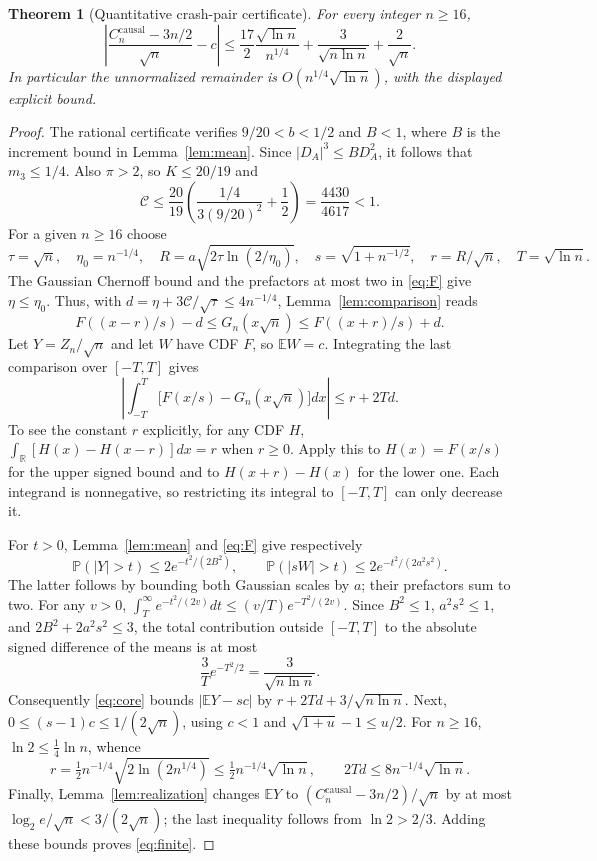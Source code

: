 \documentclass[11pt,a4paper]{article}
\newtheorem{theorem}{Theorem}
\newcommand{\E}{\mathbb E}
\newcommand{\Prob}{\mathbb P}
\newcommand{\causal}{\mathrm{causal}}
\newcommand{\R}{\mathbb R}
\begin{document}
\begin{theorem}[Quantitative crash-pair certificate]\label{thm:finite}
For every integer $n\ge16$,
\begin{equation}\label{eq:finite}
\boxed{\left|\frac{C_n^{\causal}-3n/2}{\sqrt n}-c\right|
\le \frac{17}{2}\frac{\sqrt{\ln n}}{n^{1/4}}
+\frac{3}{\sqrt{n\ln n}}+\frac{2}{\sqrt n}.}
\end{equation}
In particular the unnormalized remainder is
$O(n^{1/4}\sqrt{\ln n})$, with the displayed explicit bound.
\end{theorem}
\begin{proof}
The rational certificate verifies $9/20<b<1/2$ and $B<1$, where
$B$ is the increment bound in Lemma~\ref{lem:mean}. Since
$|D_A|^3\le B D_A^2$, it follows that $m_3\le1/4$. Also $\pi>2$,
so $K\le20/19$ and
\[
\mathcal C\le\frac{20}{19}
\left(\frac{1/4}{3(9/20)^2}+\frac12\right)
=\frac{4430}{4617}<1.
\]
For a given $n\ge16$ choose
\[
\tau=\sqrt n,\quad \eta_0=n^{-1/4},\quad
R=a\sqrt{2\tau\ln(2/\eta_0)},\quad
s=\sqrt{1+n^{-1/2}},\quad r=R/\sqrt n,\quad T=\sqrt{\ln n}.
\]
The Gaussian Chernoff bound and the prefactors at most two in
\eqref{eq:F} give $\eta\le\eta_0$. Thus, with
$d=\eta+3\mathcal C/\sqrt\tau\le4n^{-1/4}$,
Lemma~\ref{lem:comparison} reads
\[
F((x-r)/s)-d\le G_n(x\sqrt n)\le F((x+r)/s)+d.
\]
Let $Y=Z_n/\sqrt n$ and let $W$ have CDF $F$, so $\E W=c$.
Integrating the last comparison over $[-T,T]$ gives
\begin{equation}\label{eq:core}
\left|\int_{-T}^T\bigl[F(x/s)-G_n(x\sqrt n)\bigr]dx\right|
\le r+2Td.
\end{equation}
To see the constant $r$ explicitly, for any CDF $H$,
$\int_{\R}[H(x)-H(x-r)]dx=r$ when $r\ge0$. Apply this to $H(x)=F(x/s)$
for the upper signed bound and to $H(x+r)-H(x)$ for the lower one.
Each integrand is nonnegative, so restricting its integral to
$[-T,T]$ can only decrease it.

For $t>0$, Lemma~\ref{lem:mean} and \eqref{eq:F} give respectively
\[
\Prob(|Y|>t)\le2e^{-t^2/(2B^2)},\qquad
\Prob(|sW|>t)\le2e^{-t^2/(2a^2s^2)}.
\]
The latter follows by bounding both Gaussian scales by $a$; their
prefactors sum to two. For any $v>0$,
$\int_T^\infty e^{-t^2/(2v)}dt\le(v/T)e^{-T^2/(2v)}$.
Since $B^2\le1$, $a^2s^2\le1$, and
$2B^2+2a^2s^2\le3$, the total contribution outside $[-T,T]$
to the absolute signed difference of the means is at most
\[
\frac3T e^{-T^2/2}=\frac{3}{\sqrt{n\ln n}}.
\]
Consequently \eqref{eq:core} bounds $|\E Y-sc|$ by
$r+2Td+3/\sqrt{n\ln n}$. Next,
$0\le(s-1)c\le1/(2\sqrt n)$, using $c<1$ and
$\sqrt{1+u}-1\le u/2$. For $n\ge16$,
$\ln2\le\tfrac14\ln n$, whence
\[
r=\tfrac12 n^{-1/4}\sqrt{2\ln(2n^{1/4})}
\le\tfrac12 n^{-1/4}\sqrt{\ln n},\qquad
2Td\le8n^{-1/4}\sqrt{\ln n}.
\]
Finally, Lemma~\ref{lem:realization} changes $\E Y$ to
$(C_n^{\causal}-3n/2)/\sqrt n$ by at most
$\log_2e/\sqrt n<3/(2\sqrt n)$; the last inequality follows from
$\ln2>2/3$. Adding these bounds proves \eqref{eq:finite}.
\end{proof}
\end{document}
